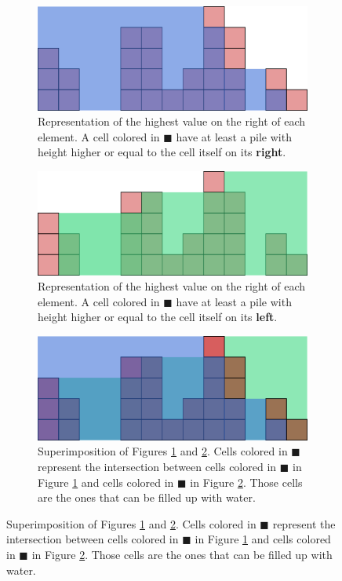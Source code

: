 \begin{figure}
\centering
\begin{subfigure}[b]{0.95\textwidth}
   \includegraphics[width=1\linewidth]{sources/trapping_water/images/DPR}
   \caption{Representation of the highest value on the right of each element. A cell colored in \textcolor[HTML]{3268d5}{$\blacksquare$} have at least a pile with height higher or equal to the cell itself on its \textbf{right}. }
   \label{fig:trapping_water_DPL}
\end{subfigure}

\begin{subfigure}[b]{0.95\textwidth}
   \includegraphics[width=1\linewidth]{sources/trapping_water/images/DPL}
   \caption{Representation of the highest value on the right of each element. A cell colored in \textcolor[HTML]{32d579}{$\blacksquare$} have at least a pile with height higher or equal to the cell itself on its \textbf{left}.}
   \label{fig:trapping_water_DPR}
\end{subfigure}

\begin{subfigure}[b]{0.95\textwidth}
   \includegraphics[width=1\linewidth]{sources/trapping_water/images/DPLR}
   \caption{Superimposition of Figures \ref{fig:trapping_water_DPL} and \ref{fig:trapping_water_DPR}. Cells colored in \textcolor[HTML]{5aa1c7}{$\blacksquare$} represent the intersection between cells colored in \textcolor[HTML]{3268d5}{$\blacksquare$} in Figure \ref{fig:trapping_water_DPL} and cells colored in \textcolor[HTML]{32d579}{$\blacksquare$} in Figure \ref{fig:trapping_water_DPR}. Those cells are the ones that can be filled up with water.}
   \label{fig:trapping_water_DPRL}
\end{subfigure}


\end{figure}
